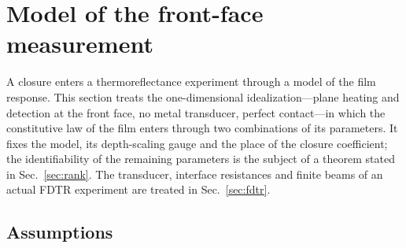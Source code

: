 \section{Model of the front-face measurement}\label{sec:frontface}

A closure enters a thermoreflectance experiment through a model of the film response. This section
treats the one-dimensional idealization---plane heating and detection at the front face, no metal
transducer, perfect contact---in which the constitutive law of the film enters through two combinations
of its parameters. It fixes the model, its depth-scaling gauge and the place of the closure coefficient;
the identifiability of the remaining parameters is the subject of a theorem stated in
Sec.~\ref{sec:rank}. The transducer, interface resistances and finite beams of an actual FDTR
experiment are treated in Sec.~\ref{sec:fdtr}.

\subsection{Assumptions}\label{sec:ff-assumptions}

